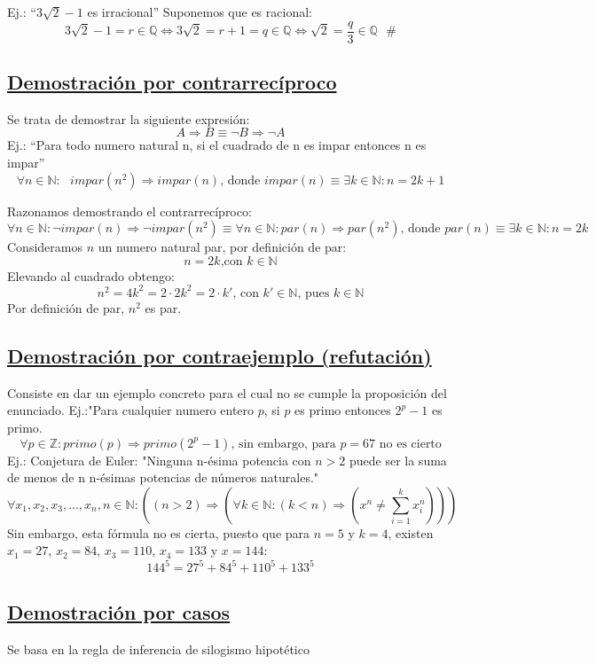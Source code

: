 \documentclass[10pt,a4paper,openright]{book}
\begin{document}
Ej.: “$3\sqrt{2}-1$ es irracional”
Suponemos que es racional:
$$3\sqrt{2}-1=r\in \mathbb Q \Leftrightarrow 3\sqrt{2}=r+1=q \in \mathbb Q \Leftrightarrow \sqrt{2}=\frac{q}{3} \in \mathbb Q \mbox{ } \#$$

\subsection*{\underline{Demostración por contrarrecíproco}}
Se trata de demostrar la siguiente expresión:
$$A \Rightarrow B \equiv \neg B \Rightarrow \neg A$$
Ej.: “Para todo numero natural n, si el cuadrado de n es impar entonces n es impar”
$$\forall n \in \mathbb N :\mbox{ } impar (n^2)\Rightarrow impar(n)\mbox{, donde }impar(n)\equiv \exists k\in \mathbb N : n=2k+1$$

Razonamos demostrando el contrarrecíproco:
$$\forall n \in \mathbb N : \neg impar(n)\Rightarrow \neg impar(n^2) \equiv \forall n \in \mathbb N:par(n)\Rightarrow par(n^2)\mbox{, donde }par(n)\equiv \exists k \in \mathbb N:n=2k$$
Consideramos $n$ un numero natural par, por definición de par:
$$n=2k\mbox{,con }k \in \mathbb N$$
Elevando al cuadrado obtengo:
$$n^2=4k^2=2\cdot 2k^2=2\cdot k'\mbox{, con }k' \in \mathbb N\mbox{, pues }k \in \mathbb N$$
Por definición de par, $n^2$ es par.

\subsection*{\underline{Demostración por contraejemplo (refutación)}}
Consiste en dar un ejemplo concreto para el cual no se cumple la proposición del enunciado.\vspace{0.5cm}
Ej.:"Para cualquier numero entero $p$, si $p$ es primo entonces $2^p-1$ es primo.
$$\forall p \in \mathbb Z: primo(p)\Rightarrow primo(2^p-1)\mbox{, sin embargo, para }p=67\mbox{ no es cierto}$$
Ej.: Conjetura de Euler: "Ninguna n-ésima potencia con $n>2$ puede ser la suma de menos  de n n-ésimas potencias de números naturales."
$$\forall x_1, x_2, x_3,..., x_n, n\in \mathbb N: \left((n>2)\Rightarrow	\left(\forall k \in \mathbb N: (k<n)\Rightarrow (x^n \neq \sum_{i=1}^{k} x_i^n)\right)\right)$$
Sin embargo, esta fórmula no es cierta, puesto que para $n=5$ y $k=4$, existen $x_1=27$, $x_2=84$, $x_3=110$, $x_4=133$ y $x=144$:
$$144^5=27^5+84^5+110^5+133^5$$

\subsection*{\underline{Demostración por casos}}
Se basa en la regla de inferencia de silogismo hipotético
\end{document}
